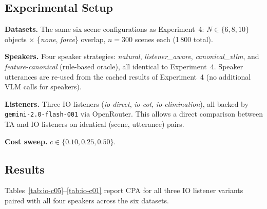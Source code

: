 \documentclass[11pt]{article}
\begin{document}
\subsection{Experimental Setup}

\textbf{Datasets.}
The same six scene configurations as Experiment~4:
$N \in \{6, 8, 10\}$ objects $\times$ \{\textit{none}, \textit{force}\} overlap,
$n = 300$ scenes each (1\,800 total).

\textbf{Speakers.}
Four speaker strategies: \textit{natural}, \textit{listener\_aware},
\textit{canonical\_vllm}, and \textit{feature-canonical} (rule-based oracle),
all identical to Experiment~4.  Speaker utterances are re-used from the cached
results of Experiment~4 (no additional VLM calls for speakers).

\textbf{Listeners.}
Three IO listeners (\textit{io-direct}, \textit{io-cot}, \textit{io-elimination}),
all backed by \texttt{gemini-2.0-flash-001} via OpenRouter.
This allows a direct comparison between TA and IO listeners on identical
(scene, utterance) pairs.

\textbf{Cost sweep.} $c \in \{0.10, 0.25, 0.50\}$.

\subsection{Results}

Tables~\ref{tab:io-c05}--\ref{tab:io-c01} report CPA for all three IO listener
variants paired with all four speakers across the six datasets.
\end{document}
